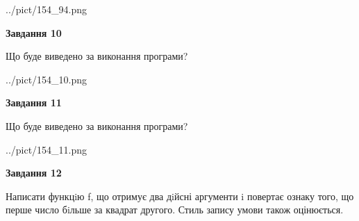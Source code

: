 \documentclass[12pt, ukrainian]{article}
\begin{document}
{\begin {large}
\begin{center}
	{../pict/154_94.png}
\end{center}
\newpage

{\begin {center}\textbf{Завдання 10}\end {center}}

Що буде виведено за виконання програми?\par
\begin{center}
	{../pict/154_10.png}
\end{center}
\newpage

{\begin {center}\textbf{Завдання 11}\end {center}}

Що буде виведено за виконання програми?\par
\begin{center}
	{../pict/154_11.png}
\end{center}
\newpage

{\begin {center}\textbf{Завдання 12}\end {center}}


Написати функцiю f, що отримує два дiйсні аргументи i повертає ознаку того, що перше число бiльше за квадрат другого. Стиль запису умови також оцінюється.\par
\newpage

\end {large}}
\end{document}
